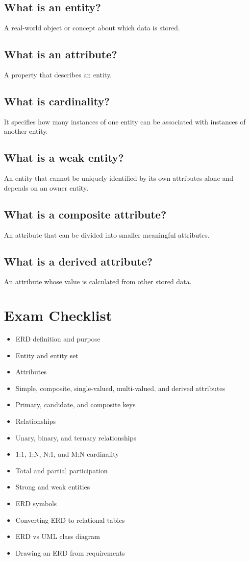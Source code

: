 \documentclass[12pt,a4paper]{article}
\begin{document}
\subsection*{What is an entity?}
A real-world object or concept about which data is stored.

\subsection*{What is an attribute?}
A property that describes an entity.

\subsection*{What is cardinality?}
It specifies how many instances of one entity can be associated with instances of another entity.

\subsection*{What is a weak entity?}
An entity that cannot be uniquely identified by its own attributes alone and depends on an owner entity.

\subsection*{What is a composite attribute?}
An attribute that can be divided into smaller meaningful attributes.

\subsection*{What is a derived attribute?}
An attribute whose value is calculated from other stored data.

\section{Exam Checklist}

\begin{itemize}[label=$\square$]
\item ERD definition and purpose
\item Entity and entity set
\item Attributes
\item Simple, composite, single-valued, multi-valued, and derived attributes
\item Primary, candidate, and composite keys
\item Relationships
\item Unary, binary, and ternary relationships
\item 1:1, 1:N, N:1, and M:N cardinality
\item Total and partial participation
\item Strong and weak entities
\item ERD symbols
\item Converting ERD to relational tables
\item ERD vs UML class diagram
\item Drawing an ERD from requirements
\end{itemize}
\end{document}
